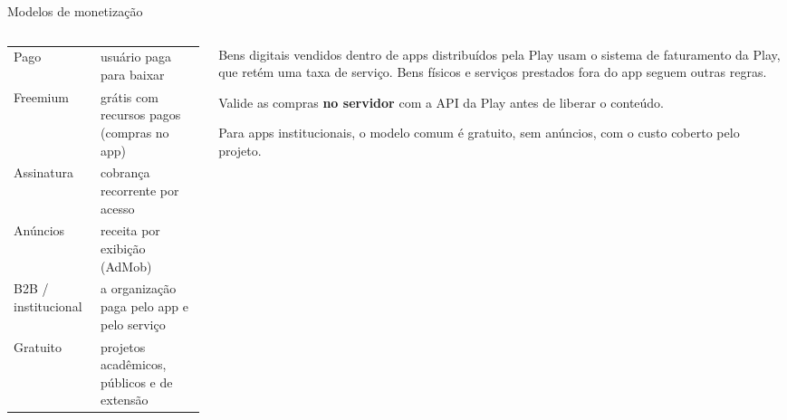 \documentclass[aspectratio=169,10pt]{beamer}
\begin{document}
\begin{frame}{Modelos de monetização}
  \begin{columns}[T]
    \begin{column}{0.5\textwidth}
      \scriptsize
      \begin{tabularx}{\linewidth}{@{}l L@{}}
        \toprule
         &  \\
        \midrule
        Pago & usuário paga para baixar \\
        Freemium & grátis com recursos pagos (compras no app) \\
        Assinatura & cobrança recorrente por acesso \\
        Anúncios & receita por exibição (AdMob) \\
        B2B / institucional & a organização paga pelo app e pelo serviço \\
        Gratuito & projetos acadêmicos, públicos e de extensão \\
        \bottomrule
      \end{tabularx}
    \end{column}
    \begin{column}{0.48\textwidth}
      \begin{conceito}
        Bens digitais vendidos dentro de apps distribuídos pela Play usam o sistema de faturamento da Play, que retém uma taxa de serviço. Bens físicos e serviços prestados fora do app seguem outras regras.
      \end{conceito}
      \begin{atencao}
        Valide as compras \textbf{no servidor} com a API da Play antes de liberar o conteúdo.
      \end{atencao}
      \begin{dica}
        Para apps institucionais, o modelo comum é gratuito, sem anúncios, com o custo coberto pelo projeto.
      \end{dica}
    \end{column}
  \end{columns}
\end{frame}
\end{document}
